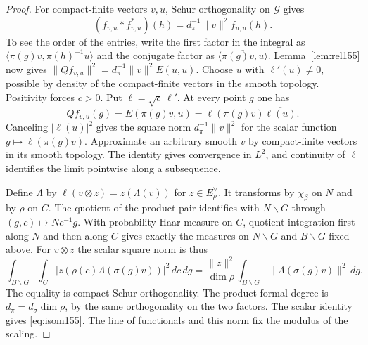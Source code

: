 \documentclass[a4paper,11pt]{article}
\theoremstyle{definition}
\theoremstyle{remark}
\numberwithin{equation}{section}
\begin{document}
\begin{proof}
For compact-finite vectors \(v,u\), Schur orthogonality on
\(\mathcal G\) gives
\[
    (f_{v,u}*f_{v,u}^{*})(h)
       =d_\pi^{-1}\|v\|^2 f_{u,u}(h).
\]
To see the order of the entries, write the first factor in the
integral as \(\langle\pi(g)v,\pi(h)^{-1}u\rangle\) and the
conjugate factor as \(\overline{\langle\pi(g)v,u\rangle}\).
Lemma~\ref{lem:rel155} now gives
\(\|Qf_{v,u}\|^2=d_\pi^{-1}\|v\|^2 E(u,u)\).
Choose \(u\) with \(\ell'(u)\ne0\), possible by density of
the compact-finite vectors in the smooth topology. Positivity
forces \(c>0\). Put \(\ell=\sqrt c\,\ell'\). At every point
\(g\) one has
\[
       Qf_{v,u}(g)=E(\pi(g)v,u)
            =\ell(\pi(g)v)\overline{\ell(u)} .
\]
Canceling \(|\ell(u)|^2\) gives the square norm
\(d_\pi^{-1}\|v\|^2\) for the scalar function
\(g\mapsto\ell(\pi(g)v)\). Approximate an arbitrary smooth
\(v\) by compact-finite vectors in its smooth topology.
The identity gives convergence in \(L^2\), and continuity
of \(\ell\) identifies the limit pointwise along a subsequence.

Define \(\Lambda\) by
\(\ell(v\otimes z)=z(\Lambda(v))\) for \(z\in E_\rho^\vee\).
It transforms by \(\chi_\beta\) on \(N\) and by \(\rho\) on
\(C\). The quotient of the product pair identifies with
\(N\backslash G\) through \((g,c)\mapsto Nc^{-1}g\).
With probability Haar measure on \(C\), quotient integration
first along \(N\) and then along \(C\) gives exactly the
measures on \(N\backslash G\) and \(B\backslash G\) fixed
above. For \(v\otimes z\) the scalar square norm is thus
\[
   \int_{B\backslash G}\int_C
      |z(\rho(c)\Lambda(\sigma(g)v))|^2\,dc\,d\dot g
     =\frac{\|z\|^2}{\dim\rho}
        \int_{B\backslash G}\|\Lambda(\sigma(g)v)\|^2\,d\dot g .
\]
The equality is compact Schur orthogonality. The product
formal degree is \(d_\pi=d_\sigma\dim\rho\), by the same
orthogonality on the two factors. The scalar identity gives
\eqref{eq:isom155}. The line of functionals and this norm fix
the modulus of the scaling.
\end{proof}
\end{document}

